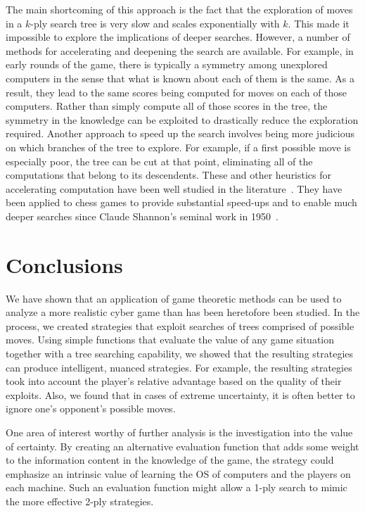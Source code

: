 \documentclass{sig-alternate-05-2015}
\begin{document}
The main shortcoming of this approach is the fact that the
exploration of moves in a $k$-ply search tree is very slow and scales
exponentially with $k$. This made it impossible to explore the
implications of deeper searches. However, a number of methods
for accelerating and deepening the search are available. For example,
in early rounds of the game, there is typically a symmetry among unexplored
computers in the sense that what is known about each of them is the
same. As a result, they lead to the same scores being computed for
moves on each of those computers. 
Rather
than simply compute all of those scores in the tree, the symmetry in
the knowledge can be exploited to drastically reduce the exploration
required. Another approach to speed up the search involves being
more judicious on which branches of the tree to explore. For example,
if a first possible move is especially poor, the tree can be cut at
that point, eliminating all of the computations that belong to its
descendents. These and other heuristics for accelerating computation
have been well studied in the literature~\cite{levy2009computer}. They
have been applied to chess games to provide substantial speed-ups and
to enable much deeper searches since Claude Shannon's seminal work in
1950~\cite{shannon1950programming}.





\section{Conclusions}
\label{sec:conc}

We have shown that an application of game theoretic methods can be used
to analyze a more realistic cyber game than has been heretofore been
studied. In the process, we created strategies that exploit searches
of trees comprised of possible moves. Using simple functions that
evaluate the value of any game situation together with a tree
searching capability, we showed that the resulting strategies can
produce intelligent, nuanced strategies. For example, the resulting
strategies took into account the player's relative advantage based on
the quality of their exploits.  Also, we found that in cases of
extreme uncertainty, it is often better to ignore one's opponent's
possible moves.

One area of interest worthy of further analysis is the investigation
into the value of certainty. 
By creating an alternative
evaluation function that adds some weight to the information content in
the knowledge of the game, the strategy could emphasize an intrinsic
value of learning the OS of computers and the players on each
machine. Such an evaluation function might allow a 1-ply search to
mimic the more effective 2-ply strategies.
\end{document}
